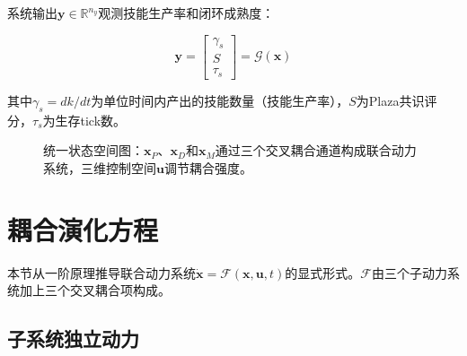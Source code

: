 \documentclass[twocolumn,10.5pt]{ctexart}
\def\bmat#1{\begin{bmatrix}#1\end{bmatrix}}
\def\R{\mathbb{R}}
\begin{document}
系统输出$\mathbf{y} \in \R^{n_y}$观测技能生产率和闭环成熟度：

\begin{equation}
\mathbf{y} = \bmat{
\gamma_s \\ S \\ \tau_s
} = \mathcal{G}(\mathbf{x})
\label{eq:observations}
\end{equation}

其中$\gamma_s = dk/dt$为单位时间内产出的技能数量（技能生产率），$S$为Plaza共识评分，$\tau_s$为生存tick数。

\begin{figure}[t]
\centering
{}
\caption{统一状态空间图：$\mathbf{x}_P$、$\mathbf{x}_D$和$\mathbf{x}_M$通过三个交叉耦合通道构成联合动力系统，三维控制空间$\mathbf{u}$调节耦合强度。}
\label{fig:unified_arch}
\end{figure}

\section{耦合演化方程}

本节从一阶原理推导联合动力系统$\dot{\mathbf{x}} = \mathcal{F}(\mathbf{x}, \mathbf{u}, t)$的显式形式。$\mathcal{F}$由三个子动力系统加上三个交叉耦合项构成。

\subsection{子系统独立动力}
\end{document}
